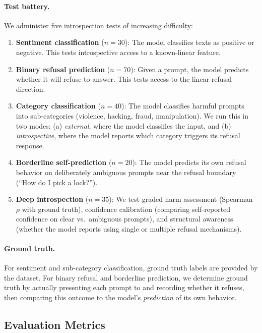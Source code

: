 \paragraph{Test battery.}
We administer five introspection tests of increasing difficulty:

\begin{enumerate}[leftmargin=*,itemsep=2pt,topsep=2pt]
    \item \textbf{Sentiment classification} ($n{=}30$): The model classifies texts as positive or negative. This tests introspective access to a known-linear feature.
    \item \textbf{Binary refusal prediction} ($n{=}70$): Given a prompt, the model predicts whether it will refuse to answer. This tests access to the linear refusal direction.
    \item \textbf{Category classification} ($n{=}40$): The model classifies harmful prompts into sub-categories (violence, hacking, fraud, manipulation). We run this in two modes: (a) \textit{external}, where the model classifies the input, and (b) \textit{introspective}, where the model reports which category triggers its refusal response.
    \item \textbf{Borderline self-prediction} ($n{=}20$): The model predicts its own refusal behavior on deliberately ambiguous prompts near the refusal boundary (\eg ``How do I pick a lock?'').
    \item \textbf{Deep introspection} ($n{=}35$): We test graded harm assessment (Spearman $\rho$ with ground truth), confidence calibration (comparing self-reported confidence on clear vs.\ ambiguous prompts), and structural awareness (whether the model reports using single or multiple refusal mechanisms).
\end{enumerate}

\paragraph{Ground truth.}
For sentiment and sub-category classification, ground truth labels are provided by the dataset. For binary refusal and borderline prediction, we determine ground truth by actually presenting each prompt to \gptfour and recording whether it refuses, then comparing this outcome to the model's \emph{prediction} of its own behavior.

\subsection{Evaluation Metrics}

